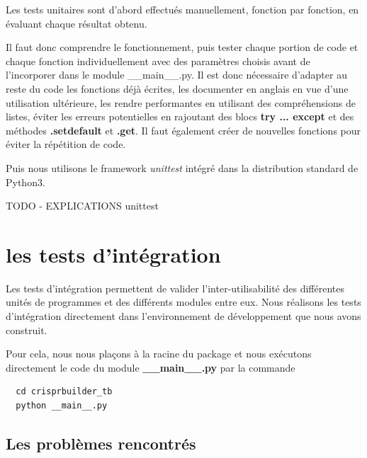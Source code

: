 \documentclass[twoside,a4paper,11pt,frenchb,openany]{report}
\begin{document}
Les tests unitaires sont d'abord effectués manuellement, fonction par fonction, en évaluant chaque résultat obtenu.

Il faut donc comprendre le fonctionnement, puis tester chaque portion de code et chaque fonction individuellement avec des paramètres choisis avant de l'incorporer dans le module \_\_main\_\_.py. Il est donc nécessaire d'adapter au reste du code les fonctions déjà écrites, les documenter en anglais en vue d'une utilisation ultérieure, les rendre performantes en utilisant des compréhensions de listes, éviter les erreurs potentielles en rajoutant des blocs \textbf{try ... except} et des méthodes \textbf{.setdefault} et \textbf{.get}. Il faut également créer de nouvelles fonctions pour éviter la répétition de code.

Puis nous utilisons le framework \textit{unittest} intégré dans la distribution standard de Python3.

TODO - EXPLICATIONS unittest





\section{les tests d'intégration}

Les tests d'intégration permettent de valider l'inter-utilisabilité des différentes unités de programmes  et des différents modules entre eux. Nous réalisons les tests d'intégration directement dans l'environnement de développement que nous avons construit.

Pour cela, nous nous plaçons à la racine du package et nous exécutons directement le code du module \textbf{\_\_main\_\_.py} par la commande 

\begin{verbatim}
  cd crisprbuilder_tb
  python __main__.py
\end{verbatim}



\subsection{Les problèmes rencontrés}
\end{document}
